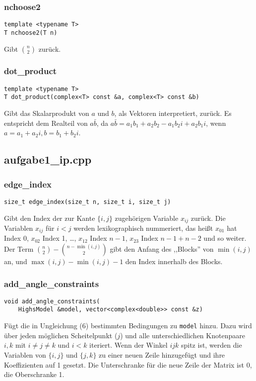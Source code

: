 \documentclass[a4paper, 10pt, ngerman]{article}
\begin{document}
\subsubsection{nchoose2}
\verb|template <typename T>| \\
\verb|T nchoose2(T n)|
\medskip

\noindent Gibt $\binom n 2$ zurück.

\subsubsection{dot\_product}
\verb|template <typename T>| \\
\verb|T dot_product(complex<T> const &a, complex<T> const &b)|
\medskip

\noindent Gibt das Skalarprodukt von $a$ und $b$, als Vektoren interpretiert, zurück. Es entspricht dem Realteil von $a \bar b$, da $a \bar b = a_1 b_1 + a_2 b_2 - a_1 b_2 i + a_2 b_1 i$, wenn $a = a_1 + a_2 i, b = b_1 + b_2 i$.

\subsection{aufgabe1\_ip.cpp}

\subsubsection{edge\_index}

\verb|size_t edge_index(size_t n, size_t i, size_t j)|
\medskip

\noindent Gibt den Index der zur Kante $\{i, j\}$ zugehörigen Variable $x_{ij}$ zurück. Die Variablen $x_{ij}$ für $i < j$ werden lexikographisch nummeriert, das heißt $x_{01}$ hat Index 0, $x_{02}$ Index 1, \dots, $x_{12}$ Index $n - 1$, $x_{23}$ Index $n - 1 + n - 2$ und so weiter. Der Term $\binom n 2 - \binom {n - \min(i, j)} 2$ gibt den Anfang des ,,Blocks'' von $\min(i, j)$ an, und $\max(i, j) - \min(i, j) - 1$ den Index innerhalb des Blocks.

\subsubsection{add\_angle\_constraints}
\verb|void add_angle_constraints(| \\
\verb|    HighsModel &model, vector<complex<double>> const &z)|
\medskip

\noindent Fügt die in Ungleichung (6) bestimmten Bedingungen zu \verb|model| hinzu. Dazu wird über jeden möglichen Scheitelpunkt ($j$) und alle unterschiedlichen Knotenpaare $i, k$ mit $i \ne j \ne k$ und $i < k$ iteriert. Wenn der Winkel $ijk$ spitz ist, werden die Variablen von $\{i, j\}$ und $\{j, k\}$ zu einer neuen Zeile hinzugefügt und ihre Koeffizienten auf 1 gesetzt. Die Unterschranke für die neue Zeile der Matrix ist 0, die Oberschranke 1.
\end{document}
